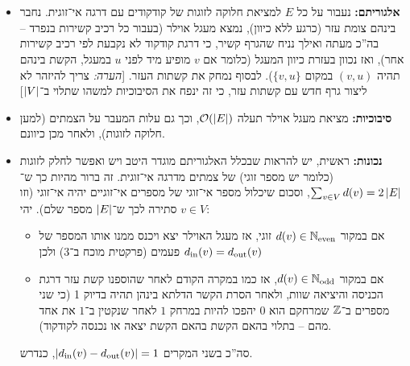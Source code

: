 \documentclass[]{../../../../tex/classes/homework}
\begin{document}
	\section{}
	\begin{itemize}
		\item \textbf{אלגוריתם: }נעבור על כל $E$ למציאת חלוקה לזוגות של קודקודים עם דרגה אי־זוגית. נחבר בינהם צומת עזר (כרגע ללא כיוון), נמצא מעגל אוילר (בעבור כל רכיב קשירות בנפרד – בה''כ מעתה ואילך נניח שהגרף קשיר, כי דרגת קודקוד לא נקבעת לפי רכיב קשירות אחר), ואז נכוון בעזרת כיוון המעגל (כלומר אם $v$ מופיע מיד לפני $u$ במעגל, הקשת בינהם תהיה $(v, u)$ במקום $\{v, u\}$). לבסוף נמחק את קשתות העזר. [\textit{הערה: }צריך להיזהר לא ליצור גרף חדש עם קשתות עזר, כי זה ינפח את הסיבוכיות למשהו שתלוי ב־$\left \lvert V \right \rvert$]
		
		\item \textbf{סיבוכיות: }מציאת מעגל אוילר תעלה $\mathcal{O}(\left \lvert E \right \rvert)$, וכך גם עלות המעבר על הצמתים (למען חלוקה לזוגות), ולאחר מכן כיוונם. 
		
		\item \textbf{נכונות: }ראשית, יש להראות שבכלל האלגוריתם מוגדר היטב ויש ואפשר לחלק לזוגות (כלומר יש מספר זוגי) של צמתים מדרגה אי־זוגית. זה ברור מהיות כך ש־$\sum_{v \in V}d(v) = 2 \left \lvert E \right \rvert$, וסכום שיכלול מספר אי־זוגי של מספרים אי־זוגיים יהיה אי־זוגי (וזו סתירה לכך ש־$\left \lvert E \right \rvert$ מספר שלם). יהי $v \in V$: 
		\begin{itemize}
			\item אם במקור $d(v) \in \mathbb{N}_{\mathrm{even}}$ זוגי, אז מעגל האוילר יצא ויכנס ממנו אותו המספר של פעמים (פרקטית מוכח ב־3) ולכן $d_{\mathrm{in}}(v) = d_{\mathrm{out}}(v)$
			\item אם במקור $d(v) \in \mathbb{N}_{\mathrm{odd }}$, אז כמו במקרה הקודם לאחר שהוספנו קשת עזר דרגת הכניסה והיציאה שוות, ולאחר הסרת הקשר הדלתא בינהן תהיה בדיוק 1 (כי שני מספרים ב־$\mathbb{Z}$ שמרחקם הוא $0$ יהפכו להיות במרחק $1$ לאחר שנקטין ב־$1$ את אחד מהם – בתלוי בהאם הקשת בהאם הקשת יצאה או נכנסה לקודקוד). 
		\end{itemize}
		סה''כ בשני המקרים $\left \lvert d_{\mathrm{in}}(v) - d_{\mathrm{out}}(v) \right \rvert = 1$, כנדרש. 
	\end{itemize}
	
	\npage
\end{document}
